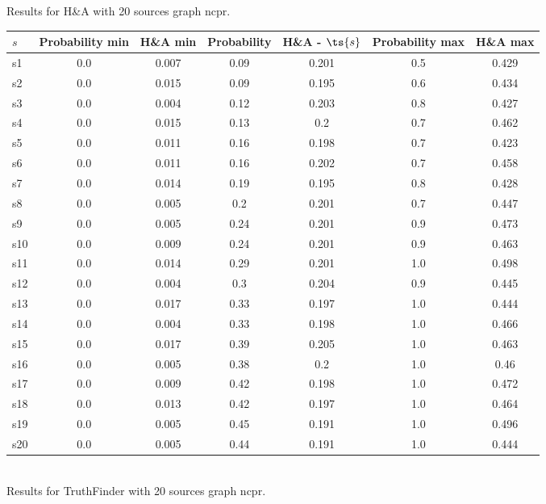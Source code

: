 \documentclass{article}
\begin{document}
\noindent Results for H\&A with 20 sources graph ncpr.

\noindent\begin{tabular}{|l|c|c|c|c|c|c|}
\hline
$s$& Probability min & H\&A min & Probability & H\&A - $\ts{s}$ & Probability max & H\&A max\\
\hline
s1 &0.0 & 0.007 & 0.09 & 0.201 & 0.5 & 0.429\\
\hline
s2 &0.0 & 0.015 & 0.09 & 0.195 & 0.6 & 0.434\\
\hline
s3 &0.0 & 0.004 & 0.12 & 0.203 & 0.8 & 0.427\\
\hline
s4 &0.0 & 0.015 & 0.13 & 0.2 & 0.7 & 0.462\\
\hline
s5 &0.0 & 0.011 & 0.16 & 0.198 & 0.7 & 0.423\\
\hline
s6 &0.0 & 0.011 & 0.16 & 0.202 & 0.7 & 0.458\\
\hline
s7 &0.0 & 0.014 & 0.19 & 0.195 & 0.8 & 0.428\\
\hline
s8 &0.0 & 0.005 & 0.2 & 0.201 & 0.7 & 0.447\\
\hline
s9 &0.0 & 0.005 & 0.24 & 0.201 & 0.9 & 0.473\\
\hline
s10 &0.0 & 0.009 & 0.24 & 0.201 & 0.9 & 0.463\\
\hline
s11 &0.0 & 0.014 & 0.29 & 0.201 & 1.0 & 0.498\\
\hline
s12 &0.0 & 0.004 & 0.3 & 0.204 & 0.9 & 0.445\\
\hline
s13 &0.0 & 0.017 & 0.33 & 0.197 & 1.0 & 0.444\\
\hline
s14 &0.0 & 0.004 & 0.33 & 0.198 & 1.0 & 0.466\\
\hline
s15 &0.0 & 0.017 & 0.39 & 0.205 & 1.0 & 0.463\\
\hline
s16 &0.0 & 0.005 & 0.38 & 0.2 & 1.0 & 0.46\\
\hline
s17 &0.0 & 0.009 & 0.42 & 0.198 & 1.0 & 0.472\\
\hline
s18 &0.0 & 0.013 & 0.42 & 0.197 & 1.0 & 0.464\\
\hline
s19 &0.0 & 0.005 & 0.45 & 0.191 & 1.0 & 0.496\\
\hline
s20 &0.0 & 0.005 & 0.44 & 0.191 & 1.0 & 0.444\\
\hline
\end{tabular}\\

\noindent Results for TruthFinder with 20 sources graph ncpr.
\end{document}
